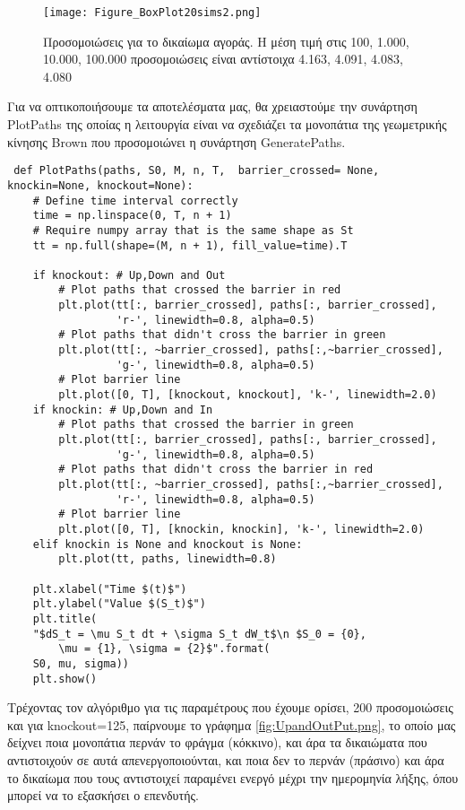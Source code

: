 \documentclass[12pt,a4paper,twoside,openany]{book}
\begin{document}
 	\begin{figure}[h!]
 		\centering
 		\texttt{[image: Figure\_BoxPlot20sims2.png]}
 		\caption{Προσομοιώσεις για το δικαίωμα αγοράς. Η μέση τιμή στις 100, 1.000, 10.000, 100.000 προσομοιώσεις είναι αντίστοιχα 4.163, 4.091, 4.083, 4.080 }
 		\label{fig:BoxPlotCall}
 	\end{figure}
 	\newpage
 	
 	\noindent Για να οπτικοποιήσουμε τα αποτελέσματα μας, θα χρειαστούμε την συνάρτηση PlotPaths της οποίας η λειτουργία είναι να σχεδιάζει τα μονοπάτια της γεωμετρικής κίνησης Brown που προσομοιώνει η συνάρτηση GeneratePaths.
 	\vspace{4mm}
 \begin{lstlisting}
 def PlotPaths(paths, S0, M, n, T,  barrier_crossed= None, knockin=None, knockout=None):
 	# Define time interval correctly
 	time = np.linspace(0, T, n + 1)
 	# Require numpy array that is the same shape as St
 	tt = np.full(shape=(M, n + 1), fill_value=time).T
 
 	if knockout: # Up,Down and Out
 		# Plot paths that crossed the barrier in red
 		plt.plot(tt[:, barrier_crossed], paths[:, barrier_crossed], 
 				 'r-', linewidth=0.8, alpha=0.5)
 		# Plot paths that didn't cross the barrier in green
 		plt.plot(tt[:, ~barrier_crossed], paths[:,~barrier_crossed], 
 				 'g-', linewidth=0.8, alpha=0.5)
 		# Plot barrier line
 		plt.plot([0, T], [knockout, knockout], 'k-', linewidth=2.0)
 	if knockin: # Up,Down and In
 		# Plot paths that crossed the barrier in green
 		plt.plot(tt[:, barrier_crossed], paths[:, barrier_crossed],
 				 'g-', linewidth=0.8, alpha=0.5)
 		# Plot paths that didn't cross the barrier in red
 		plt.plot(tt[:, ~barrier_crossed], paths[:,~barrier_crossed],
 				 'r-', linewidth=0.8, alpha=0.5)
 		# Plot barrier line
 		plt.plot([0, T], [knockin, knockin], 'k-', linewidth=2.0)
 	elif knockin is None and knockout is None:
 		plt.plot(tt, paths, linewidth=0.8) 
 		
 	plt.xlabel("Time $(t)$")
 	plt.ylabel("Value $(S_t)$")
 	plt.title(
 	"$dS_t = \mu S_t dt + \sigma S_t dW_t$\n $S_0 = {0}, 
 		\mu = {1}, \sigma = {2}$".format(
 	S0, mu, sigma))
 	plt.show() \end{lstlisting}
 	\vspace{4mm}
 	Τρέχοντας τον αλγόριθμο για τις παραμέτρους που έχουμε ορίσει, 200 προσομοιώσεις και για knockout=125, παίρνουμε το γράφημα \eqref{fig:UpandOutPut.png}, το οποίο μας δείχνει ποια μονοπάτια περνάν το φράγμα (κόκκινο), και άρα τα δικαιώματα που αντιστοιχούν σε αυτά απενεργοποιούνται, και ποια δεν το περνάν (πράσινο) και άρα το δικαίωμα που τους αντιστοιχεί παραμένει ενεργό μέχρι την ημερομηνία λήξης, όπου μπορεί να το εξασκήσει ο επενδυτής.
\end{document}
